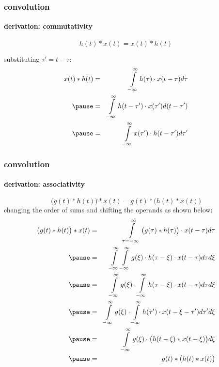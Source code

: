 \begin{frame}\frametitle{convolution}\framesubtitle{derivation: commutativity}
\begin{footnotesize}
		\begin{equation*}
			h(t) \ast x(t)	= x(t) \ast h(t) 
		\end{equation*}
		
        \bigskip
        substituting $\tau'=t-\tau$:
		\begin{eqnarray*}
			x(t) \ast h(t)
					&=& \int\limits_{-\infty}^{\infty}{h(\tau)\cdot x(t-\tau)} d\tau\nonumber\\
                    \pause&=& \int\limits_{-\infty}^{\infty}{h(t-\tau')\cdot x(\tau')}d(t-\tau') \nonumber\\
					\pause&=& \int\limits_{-\infty}^{\infty}{x(\tau')\cdot h(t-\tau')}d\tau' 
		\end{eqnarray*}
\end{footnotesize}
\end{frame}	

\begin{frame}\frametitle{convolution}\framesubtitle{derivation: associativity}
\vspace{-6mm}
\begin{footnotesize}
		\begin{equation*}
			\big(g(t) \ast h(t)\big) \ast x(t) = g(t) \ast \big(h(t) \ast x(t)\big)
		\end{equation*}
		changing the order of sums and shifting the operands as shown below:
		\begin{eqnarray*}
			\big(g(t) \ast h(t)\big) \ast x(t)	&=& \int\limits_{\tau=-\infty}^{\infty}{\big(g(\tau) \ast h(\tau)\big)\cdot x(t-\tau)}d\tau\nonumber\\
												\pause&=& \int\limits_{-\infty}^{\infty}{\int\limits_{-\infty}^{\infty}{g(\xi)\cdot h(\tau-\xi)}\cdot x(t-\tau)}d\tau d\xi\nonumber\\
												\pause&=& \int\limits_{-\infty}^{\infty}{g(\xi)\cdot \int\limits_{-\infty}^{\infty}{h(\tau-\xi)}\cdot x(t-\tau)}d\tau d\xi\nonumber\\
												\pause&=& \int\limits_{-\infty}^{\infty}{g(\xi)\cdot \int\limits_{-\infty}^{\infty}{h(\tau')}\cdot x(t-\xi-\tau')d\tau' d\xi}\nonumber\\
												\pause&=& \int\limits_{-\infty}^{\infty}{g(\xi)\cdot  \big(h(t-\xi) \ast x(t-\xi)\big)} d\xi\nonumber\\
												\pause&=& g(t) \ast \big(h(t) \ast x(t)\big) 
		\end{eqnarray*}
\end{footnotesize}
\end{frame}	

